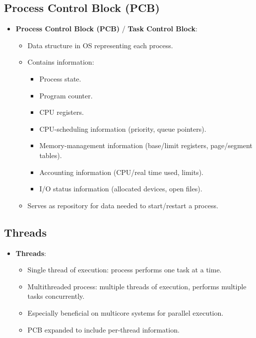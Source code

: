 \subsection{Process Control Block (PCB)}
\begin{itemize}
    \item \textbf{Process Control Block (PCB)} / \textbf{Task Control Block}:
        \begin{itemize}
            \item Data structure in OS representing each process.
            \item Contains information:
                \begin{itemize}
                    \item Process state.
                    \item Program counter.
                    \item CPU registers.
                    \item CPU-scheduling information (priority, queue pointers).
                    \item Memory-management information (base/limit registers, page/segment tables).
                    \item Accounting information (CPU/real time used, limits).
                    \item I/O status information (allocated devices, open files).
                \end{itemize}
            \item Serves as repository for data needed to start/restart a process.
        \end{itemize}
\end{itemize}

\subsection{Threads}
\begin{itemize}
    \item \textbf{Threads}:
        \begin{itemize}
            \item Single thread of execution: process performs one task at a time.
            \item Multithreaded process: multiple threads of execution, performs multiple tasks concurrently.
            \item Especially beneficial on multicore systems for parallel execution.
            \item PCB expanded to include per-thread information.
        \end{itemize}
\end{itemize}
